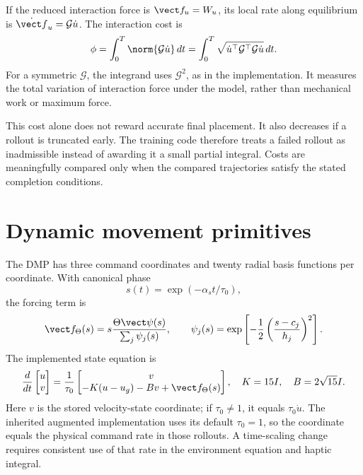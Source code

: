 If the reduced interaction force is $\vect f_u=W_u$, its local rate along equilibrium is $\dot{\vect f}_u=\mathcal G\dot u$. The interaction cost is
\begin{equation}
\phi=\int_0^T\norm{\mathcal G\dot u}\,dt
=\int_0^T\sqrt{\dot u^\top\mathcal G^\top\mathcal G\dot u}\,dt.
\label{eq:haptic-distance}
\end{equation}
For a symmetric $\mathcal G$, the integrand uses $\mathcal G^2$, as in the implementation. It measures the total variation of interaction force under the model, rather than mechanical work or maximum force.

This cost alone does not reward accurate final placement. It also decreases if a rollout is truncated early. The training code therefore treats a failed rollout as inadmissible instead of awarding it a small partial integral. Costs are meaningfully compared only when the compared trajectories satisfy the stated completion conditions.

\section{Dynamic movement primitives}
\label{sec:dmp}

The DMP has three command coordinates and twenty radial basis functions per coordinate. With canonical phase
\begin{equation}
s(t)=\exp(-\alpha_s t/\tau_0),
\end{equation}
the forcing term is
\begin{equation}
\vect f_{\Theta}(s)=s\frac{\Theta\vect\psi(s)}{\sum_j\psi_j(s)},\qquad
\psi_j(s)=\exp\left[-\frac12\left(\frac{s-c_j}{h_j}\right)^2\right].
\label{eq:dmp-forcing}
\end{equation}
The implemented state equation is
\begin{equation}
\frac{d}{dt}\begin{bmatrix}u\\v\end{bmatrix}
=\frac1{\tau_0}\begin{bmatrix}
v\\-K(u-u_g)-Bv+\vect f_{\Theta}(s)
\end{bmatrix},
\quad K=15I,\quad B=2\sqrt{15}I.
\label{eq:dmp-state}
\end{equation}
Here $v$ is the stored velocity-state coordinate; if $\tau_0\neq1$, it equals $\tau_0\dot u$. The inherited augmented implementation uses its default $\tau_0=1$, so the coordinate equals the physical command rate in those rollouts. A time-scaling change requires consistent use of that rate in the environment equation and haptic integral.


